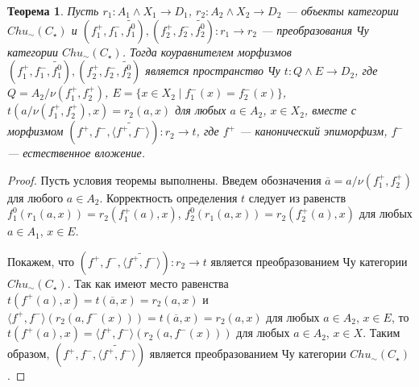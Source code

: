 \documentclass[a4paper,12pt]{article}
\newtheorem{theorem}{Теорема}
\begin{document}
\begin{theorem}
    Пусть $r_1: A_1 \wedge X_1 \to D_1$, $r_2: A_2 \wedge X_2 \to D_2$ --- объекты категории $Chu_\sim(C_\star)$ и $(f_1^+,f_1^-,\widetilde{f_1^0}), (f_2^+,f_2^-,\widetilde{f_2^0}): r_1 \to r_2$ --- преобразования Чу категории $Chu_\sim(C_\star)$. Тогда коуравнителем морфизмов $(f_1^+,f_1^-,\widetilde{f_1^0}), (f_2^+,f_2^-,\widetilde{f_2^0})$ является пространство Чу $t: Q \wedge E \to D_2$, где $Q = A_2/\nu(f_1^+,f_2^+)$, $E = \{x \in X_2 \mid f_1^-(x) = f_2^-(x)\}$, $t(a/\nu(f_1^+,f_2^+),x) = r_2(a,x)$ для любых $a \in A_2$, $x \in X_2$, вместе с морфизмом $(f^+,f^-,\widetilde{\langle f^+,f^- \rangle}): r_2 \to t$, где $f^+$ --- канонический эпиморфизм, $f^-$ --- естественное вложение. 
\end{theorem}
\begin{proof}
    Пусть условия теоремы выполнены. Введем обозначения $\overline{a} = a/\nu(f_1^+,f_2^+)$ для любого $a \in A_2$. Корректность определения $t$ следует из равенств $f_1^0(r_1(a,x)) = r_2(f_1^+(a),x)$, $f_2^0(r_1(a,x)) = r_2(f_2^+(a),x)$ для любых $a \in A_1$, $x \in E$.

    Покажем, что $(f^+,f^-,\widetilde{\langle f^+,f^- \rangle}): r_2 \to t$ является преобразованием Чу категории $Chu_\sim(C_\star)$. Так как имеют место равенства $t(f^+(a),x) = t(\overline{a},x) = r_2(a,x)$ и $\langle f^+,f^- \rangle(r_2(a,f^-(x))) = t(\overline{a},x) = r_2(a,x)$ для любых $a \in A_2$, $x \in E$, то $t(f^+(a),x) = \langle f^+,f^- \rangle(r_2(a,f^-(x)))$ для любых $a \in A_2$, $x \in X$. Таким образом, $(f^+,f^-,\widetilde{\langle f^+,f^- \rangle})$ является преобразованием Чу категории $Chu_\sim(C_\star)$.


\end{proof}
\end{document}
